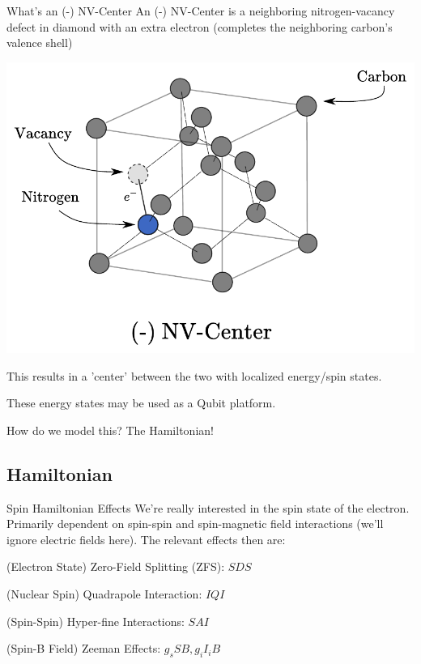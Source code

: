 \documentclass[11pt]{beamer}
\begin{document}
\begin{frame}{What's an (-) NV-Center}
An (-) NV-Center is a neighboring nitrogen-vacancy defect in diamond with an extra electron (completes the neighboring carbon's valence shell)

\begin{center}

\includegraphics[scale=0.47]{diamond_nv.pdf}

\end{center}

This results in a 'center' between the two with localized energy/spin  states.

\medskip

These energy states may be used as a Qubit platform.

\medskip

How do we model this? The Hamiltonian!
\end{frame}
\subsection{Hamiltonian}
\begin{frame}{Spin Hamiltonian Effects}
We're really interested in the spin state of the electron. Primarily dependent on spin-spin and spin-magnetic field interactions (we'll ignore electric fields here). The relevant effects then are:

\vspace{.7cm}

(Electron State) Zero-Field Splitting (ZFS): $SDS$

\vspace{.7cm}

(Nuclear Spin) Quadrapole Interaction: $IQI$ 

\vspace{.7cm}

(Spin-Spin) Hyper-fine Interactions:  $SAI$

\vspace{.7cm}

(Spin-B Field) Zeeman Effects: $g_sSB, g_iI_iB$
\end{frame}
\end{document}
